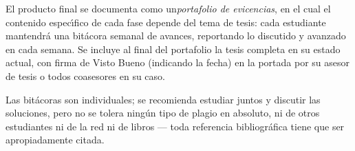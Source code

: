 El producto final se documenta como un{\em portafolio de evicencias},
en el cual el contenido espec\'{\i}fico de cada fase depende del tema
de tesis: cada estudiante mantendr\'{a} una bit\'{a}cora semanal de
avances, reportando lo discutido y avanzado en cada semana. Se incluye
al final del portafolio la tesis completa en su estado actual, con
firma de Visto Bueno (indicando la fecha) en la portada por su asesor
de tesis o todos coasesores en su caso.

Las bit\'{a}coras son individuales; se recomienda estudiar juntos y
discutir las soluciones, pero no se tolera ning\'{u}n tipo de plagio
en absoluto, ni de otros estudiantes ni de la red ni de libros ---
toda referencia bibliogr\'{a}fica tiene que ser apropiadamente citada.



